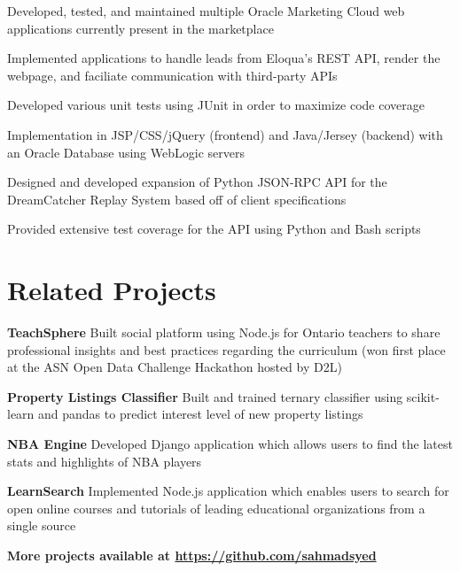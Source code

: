 \documentclass[letterpaper]{deedy-resume}
\begin{document}
\begin{minipage}[t]{0.66\textwidth}
\sectionspace


\begin{tightitemize}
\item Developed, tested, and maintained multiple Oracle Marketing Cloud web applications currently present in the marketplace
\item Implemented applications to handle leads from Eloqua's REST API, render the webpage, and faciliate communication with third-party APIs
\item Developed various unit tests using JUnit in order to maximize code coverage
\item Implementation in JSP/CSS/jQuery (frontend) and Java/Jersey (backend) with an Oracle Database using WebLogic servers
\end{tightitemize}

\sectionspace


\begin{tightitemize}
\item Designed and developed expansion of Python JSON-RPC API for the DreamCatcher Replay System based off of client specifications
\item Provided extensive test coverage for the API using Python and Bash scripts
\end{tightitemize}

\sectionspace

\section{Related Projects}

\textbf{TeachSphere}
Built social platform using Node.js for Ontario teachers to share professional insights and best practices regarding the curriculum (won first place at the ASN Open Data Challenge Hackathon hosted by D2L)
\vspace*{0.2cm}

\textbf{Property Listings Classifier}
Built and trained ternary classifier using scikit-learn and pandas to predict interest level of new property listings
\vspace*{0.2cm}

\textbf{NBA Engine}
Developed Django application which allows users to find the latest stats and highlights of NBA players
\vspace*{0.2cm}

\textbf{LearnSearch}
Implemented Node.js application which enables users to search for open online courses and tutorials of leading educational organizations from a single source
\sectionspace

\textbf{More projects available at \href{https://github.com/sahmadsyed}{https://github.com/sahmadsyed}}

\end{minipage} %
\end{document}
